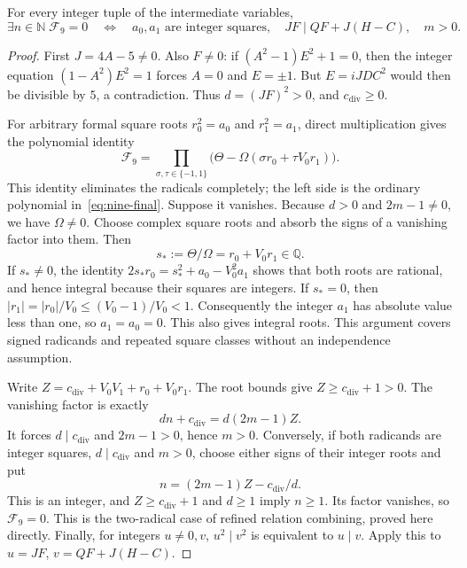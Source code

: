 \begin{lemma}
\label{lem:nine-finalizer}
For every integer tuple of the intermediate variables,
\[
 \exists n\in\mathbb N\;\mathcal F_9=0
 \quad\Longleftrightarrow\quad
 a_0,a_1\text{ are integer squares},\quad
 JF\mid QF+J(H-C),\quad m>0.
\]
\end{lemma}
\begin{proof}
First $J=4A-5\ne0$.  Also $F\ne0$: if
$(A^2-1)E^2+1=0$, then the integer equation
$(1-A^2)E^2=1$ forces $A=0$ and $E=\pm1$.
But $E=iJDC^2$ would then be divisible by $5$, a contradiction.
Thus $d=(JF)^2>0$, and $c_\mathrm{div}\geq0$.

For arbitrary formal square roots $r_0^2=a_0$ and $r_1^2=a_1$,
direct multiplication gives the polynomial identity
\[
 \mathcal F_9=
 \prod_{\sigma,\tau\in\{-1,1\}}
 \bigl(\Theta-\Omega(\sigma r_0+\tau V_0r_1)\bigr).
\]
This identity eliminates the radicals completely; the left side is the
ordinary polynomial in~\eqref{eq:nine-final}.  Suppose it vanishes.
Because $d>0$ and $2m-1\ne0$, we have $\Omega\ne0$.
Choose complex square roots and absorb the signs of a vanishing factor
into them.  Then
\[
 s_*:=\Theta/\Omega=r_0+V_0r_1\in\mathbb Q.
\]
If $s_*\ne0$, the identity
$2s_*r_0=s_*^2+a_0-V_0^2a_1$ shows that both roots are rational,
and hence integral because their squares are integers.
If $s_*=0$, then
$|r_1|=|r_0|/V_0\leq(V_0-1)/V_0<1$.
Consequently the integer $a_1$ has absolute value less than one,
so $a_1=a_0=0$.  This also gives integral roots.  This argument covers
signed radicands and repeated square classes without an independence
assumption.

Write $Z=c_\mathrm{div}+V_0V_1+r_0+V_0r_1$.
The root bounds give $Z\geq c_\mathrm{div}+1>0$.
The vanishing factor is exactly
\[
 dn+c_\mathrm{div}=d(2m-1)Z.
\]
It forces $d\mid c_\mathrm{div}$ and $2m-1>0$, hence $m>0$.
Conversely, if both radicands are integer squares,
$d\mid c_\mathrm{div}$ and $m>0$, choose either signs of their
integer roots and put
\[
 n=(2m-1)Z-c_\mathrm{div}/d.
\]
This is an integer, and $Z\geq c_\mathrm{div}+1$ and $d\geq1$
imply $n\geq1$.  Its factor vanishes, so $\mathcal F_9=0$.
This is the two-radical case of refined relation combining, proved
here directly.  Finally, for integers $u\ne0,v$,
$u^2\mid v^2$ is equivalent to $u\mid v$.  Apply this to
$u=JF$, $v=QF+J(H-C)$.
\end{proof}

